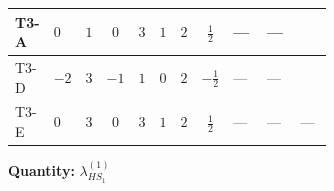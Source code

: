 \documentclass[8pt]{article}
\begin{document}
\begin{landscape}
\begin{longtable}{@{}llcccccc >{\raggedright\arraybackslash}p{0.21\linewidth} >{\raggedright\arraybackslash}p{0.21\linewidth} >{\raggedright\arraybackslash}p{0.21\linewidth}@{}}
\midrule
T3-A & $0$ & $1$ & $0$ & $3$ & $1$ & $2$ & $\frac{1}{2}$ & --- & --- & \scriptsize\adjustbox{max width=\linewidth}{$\begin{gathered} +6 {\lambda_{12}^{(1)}} {\lambda_{HS_2}^{(1)}}\end{gathered}$} \\
\midrule
T3-D & $-2$ & $3$ & $-1$ & $1$ & $0$ & $2$ & $-\frac{1}{2}$ & --- & --- & \scriptsize\adjustbox{max width=\linewidth}{$\begin{gathered} +2 {\lambda_{12}^{(1)}} {\lambda_{HS_2}^{(1)}}\end{gathered}$} \\
\midrule
T3-E & $0$ & $3$ & $0$ & $3$ & $1$ & $2$ & $\frac{1}{2}$ & --- & --- & --- \\
\midrule
\bottomrule
\end{longtable}
\clearpage
\noindent\textbf{Quantity: }$\lambda_{HS_1}^{(1)}$\par\smallskip

\end{landscape}
\end{document}

